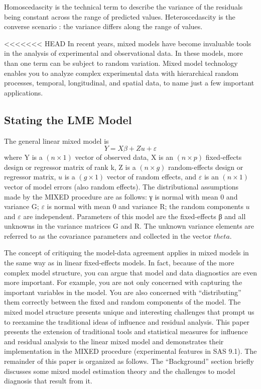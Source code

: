 \documentclass[12pt, a4paper]{report}
\theoremstyle{plain}
\theoremstyle{definition}
\theoremstyle{remark}
\begin{document}


Homoscedascity is the technical term to describe the variance of the
residuals being constant across the range of predicted values.
Heteroscedascity is the converse scenario : the variance differs along
the range of values.






<<<<<<< HEAD
In recent years, mixed models have become invaluable tools in the analysis of experimental and observational
data. In these models, more than one term can be subject to random variation. Mixed model
technology enables you to analyze complex experimental data with hierarchical random processes, temporal,
longitudinal, and spatial data, to name just a few important applications. 

\subsection{Stating the LME Model}
The general linear mixed
model is
\[
Y = X\beta + Zu + \varepsilon\]
where Y is a $(n\times1)$ vector of observed data, X is an $(n\times p)$ fixed-effects design or regressor matrix of rank
k, Z is a $(n \times g)$ random-effects design or regressor matrix, $u$ is a $(g \times 1)$ vector of random effects, and $\varepsilon$ is
an $(n\times1)$ vector of model errors (also random effects). The distributional assumptions made by the MIXED
procedure are as follows: γ is normal with mean 0 and variance G; $\varepsilon$ is normal with mean 0 and variance
R; the random components $u$ and $\varepsilon$ are independent. Parameters of this model are the fixed-effects β and
all unknowns in the variance matrices G and R. The unknown variance elements are referred to as the
covariance parameters and collected in the vector $theta$.

The concept of critiquing the model-data agreement applies in mixed models in the same way as in linear
fixed-effects models. In fact, because of the more complex model structure, you can argue that model and
data diagnostics are even more important. For example, you are not only concerned with capturing the
important variables in the model. You are also concerned with “distributing” them correctly between the
fixed and random components of the model. The mixed model structure presents unique and interesting
challenges that prompt us to reexamine the traditional ideas of influence and residual analysis.
This paper presents the extension of traditional tools and statistical measures for influence and residual
analysis to the linear mixed model and demonstrates their implementation in the MIXED procedure (experimental
features in SAS 9.1). The remainder of this paper is organized as follows. The “Background” section
briefly discusses some mixed model estimation theory and the challenges to model diagnosis that result
from it.
\end{document}
